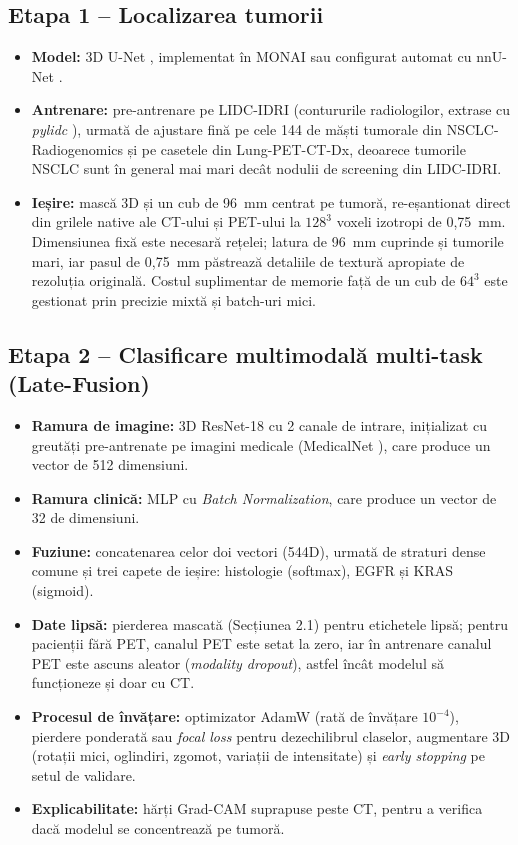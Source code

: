 \documentclass[11pt, a4paper]{article}
\begin{document}
\subsection{Etapa 1 -- Localizarea tumorii}
\begin{itemize}
    \item \textbf{Model:} 3D U-Net \cite{cicek2016}, implementat în MONAI sau configurat automat cu nnU-Net \cite{isensee2021}.
    \item \textbf{Antrenare:} pre-antrenare pe LIDC-IDRI (contururile radiologilor, extrase cu \textit{pylidc} \cite{hancock2016}), urmată de ajustare fină pe cele 144 de măști tumorale din NSCLC-Radiogenomics și pe casetele din Lung-PET-CT-Dx, deoarece tumorile NSCLC sunt în general mai mari decât nodulii de screening din LIDC-IDRI.
    \item \textbf{Ieșire:} mască 3D și un cub de 96~mm centrat pe tumoră, re-eșantionat direct din grilele native ale CT-ului și PET-ului la $128^3$ voxeli izotropi de 0,75~mm. Dimensiunea fixă este necesară rețelei; latura de 96~mm cuprinde și tumorile mari, iar pasul de 0,75~mm păstrează detaliile de textură apropiate de rezoluția originală. Costul suplimentar de memorie față de un cub de $64^3$ este gestionat prin precizie mixtă și batch-uri mici.
\end{itemize}

\subsection{Etapa 2 -- Clasificare multimodală multi-task (Late-Fusion)}
\begin{itemize}
    \item \textbf{Ramura de imagine:} 3D ResNet-18 \cite{he2016} cu 2 canale de intrare, inițializat cu greutăți pre-antrenate pe imagini medicale (MedicalNet \cite{chen2019}), care produce un vector de 512 dimensiuni.
    \item \textbf{Ramura clinică:} MLP cu \textit{Batch Normalization}, care produce un vector de 32 de dimensiuni.
    \item \textbf{Fuziune:} concatenarea celor doi vectori (544D), urmată de straturi dense comune și trei capete de ieșire: histologie (softmax), EGFR și KRAS (sigmoid).
    \item \textbf{Date lipsă:} pierderea mascată (Secțiunea 2.1) pentru etichetele lipsă; pentru pacienții fără PET, canalul PET este setat la zero, iar în antrenare canalul PET este ascuns aleator (\textit{modality dropout}), astfel încât modelul să funcționeze și doar cu CT.
    \item \textbf{Procesul de învățare:} optimizator AdamW (rată de învățare $10^{-4}$), pierdere ponderată sau \textit{focal loss} pentru dezechilibrul claselor, augmentare 3D (rotații mici, oglindiri, zgomot, variații de intensitate) și \textit{early stopping} pe setul de validare.
    \item \textbf{Explicabilitate:} hărți Grad-CAM \cite{selvaraju2017} suprapuse peste CT, pentru a verifica dacă modelul se concentrează pe tumoră.
\end{itemize}
\end{document}
